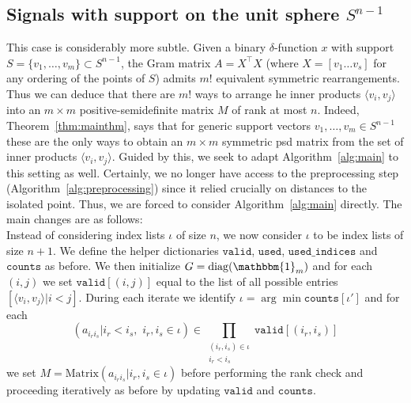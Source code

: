 \documentclass{article}
\theoremstyle{definition}
\newcommand{\ip}[2]{\langle {#1}, {#2} \rangle}
\renewcommand{\|}{|}
\renewcommand{\i}{\mathscr{I}}
\renewcommand{\i}{\mathcal{I}}
\newcommand{\valid}{\texttt{valid}}
\newcommand{\counts}{\texttt{counts}}
\newcommand{\used}{\texttt{used}}
\newcommand{\usedind}{\texttt{used\_indices}}
\begin{document}
\subsection{Signals with support on the unit sphere $S^{n-1}$}\label{sec:unitsphere}
This case is considerably more subtle. Given a binary $\delta$-function $x$ with support $S = \{v_1, \ldots , v_m\} 
\subset S^{n-1}$, the Gram matrix $A = X^\top X$ (where $X = [v_1 \ldots v_s]$ for any ordering of the points of $S$) admits $m!$ equivalent symmetric rearrangements. Thus we can deduce that there are $m!$ ways to arrange he inner products $\ip{v_i}{v_j}$ into an $m\times m$ positive-semidefinite matrix $M$ of rank at most $n$. Indeed, Theorem~\ref{thm:mainthm}, says that for generic support vectors $v_1, \dots, v_m\in S^{n-1}$ these are the only ways to obtain an $m \times m$ symmetric psd matrix from the set of inner products $\langle v_i, v_j \rangle$. Guided by this, we seek to adapt Algorithm~\ref{alg:main} to this setting as well.  Certainly, we no longer have access to the preprocessing step (Algorithm~\ref{alg:preprocessing}) since it relied crucially on distances to the isolated point. Thus, we are forced to consider Algorithm~\ref{alg:main} directly. The main changes are as follows: \\

Instead of considering index lists $\iota$ of size $n$, we now consider $\iota$ to be index lists of size $n+1$. We define the helper dictionaries $\valid$, $\used$, $\usedind$ and $\counts$ as before. We then initialize $G = \mathrm{diag}(\mathbbm{1}_m)$ and for each $(i,j)$  we set $\valid[(i,j)]$ equal to the list of all possible entries $[\ip{v_i}{v_j} | i<j]$. During each iterate we identify $\iota = \arg\min \counts[\iota']$ and for each
$$(a_{i_ri_s} | i_r<i_s,\, \, i_r,i_s \in \iota) \in \prod_{\substack{(i_r,i_s) \in \iota\\i_r<i_s}} \valid[(i_r,i_s)]$$
we set $M= \mathrm{Matrix}(a_{i_ri_s} | i_r,i_s \in \iota)$ before performing the rank check and proceeding iteratively as before by updating $\valid$ and $\counts$. 
\end{document}
